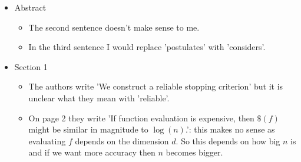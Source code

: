\documentclass{amsart}
\begin{document}
\begin{itemize}
\item Abstract
\begin{itemize}
\item The second sentence doesn't make sense to me.
\item In the third sentence I would replace 'postulates' with 'considers'.
\end{itemize}

\item Section 1
\begin{itemize}
\item The authors write 'We construct a reliable stopping criterion' but it is
unclear what they mean with 'reliable'.
\item On page 2 they write 'If function evaluation is expensive, then $\$(f)$ might
be similar in magnitude to $\log(n)$.': this makes no sense as evaluating $f$
depends on the dimension $d$. So this depends on how big $n$ is and if we want more
accuracy then $n$ becomes bigger.
\end{itemize}


\end{itemize}
\end{document}
